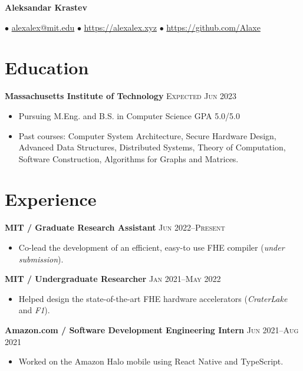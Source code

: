 \documentclass[letterpaper,11pt]{article}
\author{Aleksandar Krastev}
\date{2020-12-21}
\begin{document}
\setlength{\belowdisplayskip}{\parskip}
\setlength{\belowdisplayshortskip}{\belowdisplayskip}
\setlength{\abovedisplayskip}{\parskip}
\setlength{\abovedisplayshortskip}{\abovedisplayskip}

\centerline{{\Huge \bf Aleksandar Krastev}}
$\bullet$ \href{mailto:alexalex@mit.edu}{alexalex@mit.edu} \hfill
$\bullet$ \href{https://alexalex.xyz}{https://alexalex.xyz} \hfill
$\bullet$ \href{https://github.com/Alaxe}{https://github.com/Alaxe} \hfill

\section*{Education}
\textbf{Massachusetts Institute of Technology}
\hfill
\textsc{Expected Jun 2023}

\begin{itemize}
    \item Pursuing M.Eng. and B.S. in Computer Science
        \hfill \textsc{GPA 5.0/5.0}
    \item Past courses:
        Computer System Architecture,
        Secure Hardware Design,
        Advanced Data Structures,
        Distributed Systems,
        Theory of Computation,
        Software Construction,
        Algorithms for Graphs and Matrices.
\end{itemize}



\section*{Experience}
\textbf{MIT / Graduate Research Assistant}
\hfill
\textsc{Jun 2022--Present}
\begin{itemize}
    \item Co-lead the development of an efficient, easy-to use FHE compiler
        (\emph{under submission}).
\end{itemize}

\textbf{MIT / Undergraduate Researcher}
\hfill
\textsc{Jan 2021--May 2022}
\begin{itemize}
    \item Helped design the state-of-the-art FHE hardware accelerators
        (\emph{CraterLake} and \emph{F1}).
\end{itemize}

\textbf{Amazon.com / Software Development Engineering Intern}
\hfill
\textsc{Jun 2021--Aug 2021}
\begin{itemize}
    \item Worked on the Amazon Halo mobile using React Native and TypeScript.
\end{itemize}
\end{document}
